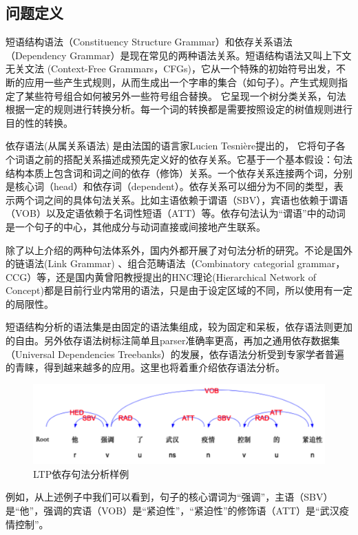 \subsection{问题定义}
短语结构语法（Constituency Structure Grammar）和依存关系语法（Dependency Grammar）是现在常见的两种语法关系。短语结构语法又叫上下文无关文法 (Context-Free Grammars，CFGs)，它从一个特殊的初始符号出发，不断的应用一些产生式规则，从而生成出一个字串的集合（如句子）。产生式规则指定了某些符号组合如何被另外一些符号组合替换。
它呈现一个树分类关系，句法根据一定的规则进行转换分析。每一个词的转换都是需要按照设定的树值规则进行目的性的转换。

依存语法(从属关系语法) 是由法国的语言家Lucien Tesnière提出的\cite{tesniere1959elements}，
它将句子各个词语之前的搭配关系描述成预先定义好的依存关系。它基于一个基本假设：句法结构本质上包含词和词之间的依存（修饰）关系。一个依存关系连接两个词，分别是核心词（head）和依存词（dependent）。依存关系可以细分为不同的类型，表示两个词之间的具体句法关系。比如主语依赖于谓语（SBV），宾语也依赖于谓语（VOB）以及定语依赖于名词性短语（ATT）等。依存句法认为“谓语”中的动词是一个句子的中心，其他成分与动词直接或间接地产生联系。

除了以上介绍的两种句法体系外，国内外都开展了对句法分析的研究。不论是国外的链语法(Link Grammar) 、组合范畴语法（Combinatory categorial grammar，CCG）等，还是国内黄曾阳教授提出的HNC理论(Hierarchical Network of Concept)\cite{黄曾阳:12}都是目前行业内常用的语法，只是由于设定区域的不同，所以使用有一定的局限性。

短语结构分析的语法集是由固定的语法集组成，较为固定和呆板，依存语法则更加的自由。另外依存语法树标注简单且parser准确率更高，再加之通用依存数据集（Universal Dependencies Treebanks）的发展，依存语法分析受到专家学者普遍的青睐，得到越来越多的应用。这里也将着重介绍依存语法分析。

\begin{figure}[h]
\centering
\includegraphics[scale=0.3]{img/chapter_nlp/parser_example.png}
\caption{LTP依存句法分析样例}
\label{fig:parserexample}
\end{figure}
例如，从上述例子中我们可以看到，句子的核心谓词为“强调”，主语（SBV）是“他”，强调的宾语（VOB）是“紧迫性”，“紧迫性”的修饰语（ATT）是“武汉疫情控制”。


